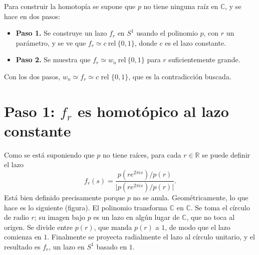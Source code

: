 \documentclass[11pt]{article}
\begin{document}
Para construir la homotopía se supone que $p$ no tiene ninguna raíz en $\mathbb{C}$, y se hace en dos pasos:
\begin{itemize}
  \item \textbf{Paso 1.} Se construye un lazo $f_r$ en $S^1$ usando el polinomio $p$, con $r$ un parámetro, y se ve que $f_r\simeq c\ \mathrm{rel}\ \{0,1\}$, donde $c$ es el lazo constante.
  \item \textbf{Paso 2.} Se muestra que $f_r\simeq w_n\ \mathrm{rel}\ \{0,1\}$ para $r$ suficientemente grande.
\end{itemize}
Con los dos pasos, $w_n\simeq f_r\simeq c$ rel $\{0,1\}$, que es la contradicción buscada.

\section*{Paso 1: $f_r$ es homotópico al lazo constante}

Como se está suponiendo que $p$ no tiene raíces, para cada $r\in\mathbb{R}$ se puede definir el lazo
\[
  f_r(s)=\frac{p(re^{2\pi i s})/p(r)}{\bigl|p(re^{2\pi i s})/p(r)\bigr|}.
\]
Está bien definido precisamente porque $p$ no se anula. Geométricamente, lo que hace es lo siguiente (figura). El polinomio transforma $\mathbb{C}$ en $\mathbb{C}$. Se toma el círculo de radio $r$; su imagen bajo $p$ es un lazo en algún lugar de $\mathbb{C}$, que no toca al origen. Se divide entre $p(r)$, que manda $p(r)$ a $1$, de modo que el lazo comienza en $1$. Finalmente se proyecta radialmente el lazo al círculo unitario, y el resultado es $f_r$, un lazo en $S^1$ basado en $1$.

\begin{center}
\end{center}
\end{document}
